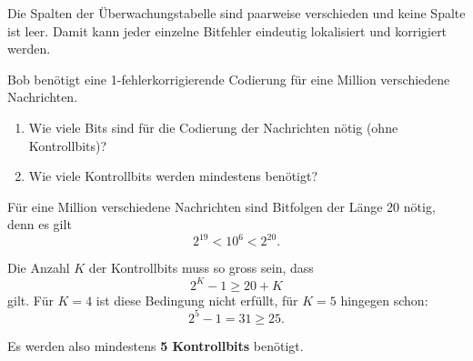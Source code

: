 \begin{myexercise}
\begin{myanswer}
\begin{center}
        \end{center}

        Die Spalten der Überwachungstabelle sind paarweise verschieden
        und keine Spalte ist leer. Damit kann jeder einzelne Bitfehler
        eindeutig lokalisiert und korrigiert werden.

    \end{myanswer}
\end{myexercise}


\begin{myexercise}
    Bob benötigt eine 1-fehlerkorrigierende Codierung
    für eine Million verschiedene Nachrichten.

    \begin{enumerate}
        \item Wie viele Bits sind für die Codierung der
              Nachrichten nötig (ohne Kontrollbits)?

        \item Wie viele Kontrollbits werden mindestens benötigt?
    \end{enumerate}
    \begin{myanswer}
        Für eine Million verschiedene Nachrichten sind Bitfolgen der
        Länge 20 nötig, denn es gilt
        \[
            2^{19} < 10^6 < 2^{20}.
        \]

        Die Anzahl \(K\) der Kontrollbits muss so gross sein, dass
        \[
            2^K-1 \geq 20+K
        \]
        gilt. Für \(K=4\) ist diese Bedingung nicht erfüllt, für
        \(K=5\) hingegen schon:
        \[
            2^5-1=31\geq 25.
        \]

        Es werden also mindestens \textbf{5 Kontrollbits} benötigt.
    \end{myanswer}
\end{myexercise}


